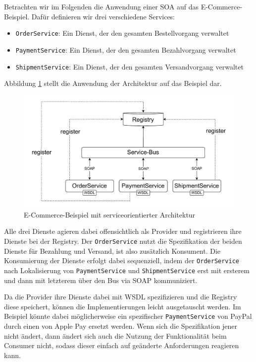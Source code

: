 \documentclass[acmtog]{acmart}
\begin{document}
Betrachten wir im Folgenden die Anwendung einer SOA auf das E-Commerce-Beispiel.
Dafür definieren wir drei verschiedene Services:
\begin{itemize}
  \item \texttt{OrderService}: Ein Dienst, der den gesamten Bestellvorgang verwaltet
  \item \texttt{PaymentService}: Ein Dienst, der den gesamten Bezahlvorgang verwaltet
  \item \texttt{ShipmentService}: Ein Dienst, der den gesamten Versandvorgang verwaltet
\end{itemize}

Abbildung \ref{fig:soaecommerce} stellt die Anwendung der Architektur auf das Beispiel dar.
\begin{figure}[!h]
  \centering
  \includegraphics[width=0.8\linewidth]{images/soa/soa-example.pdf}
  \caption{E-Commerce-Beispiel mit serviceorientierter Architektur}
  \label{fig:soaecommerce}
\end{figure}

Alle drei Dienste agieren dabei offensichtlich als Provider und registrieren ihre Dienste bei der Registry.
Der \texttt{OrderService} nutzt die Spezifikation der beiden Dienste für Bezahlung und Versand, ist also zusätzlich Konsument.
Die Konsumierung der Dienste erfolgt dabei sequenziell, indem der \texttt{OrderService} nach Lokalisierung von \texttt{PaymentService} und \texttt{ShipmentService}
erst mit ersterem und dann mit letzterem über den Bus via SOAP kommuniziert.

Da die Provider ihre Dienste dabei mit WSDL spezifizieren und die Registry diese speichert, können die Implementierungen leicht ausgetauscht werden.
Im Beispiel könnte dabei möglicherweise ein spezifischer \texttt{PaymentService} von PayPal durch einen von Apple Pay ersetzt werden.
Wenn sich die Spezifikation jener nicht ändert, dann ändert sich auch die Nutzung der Funktionalität beim Consumer nicht, sodass dieser einfach
auf geänderte Anforderungen reagieren kann.
\end{document}
